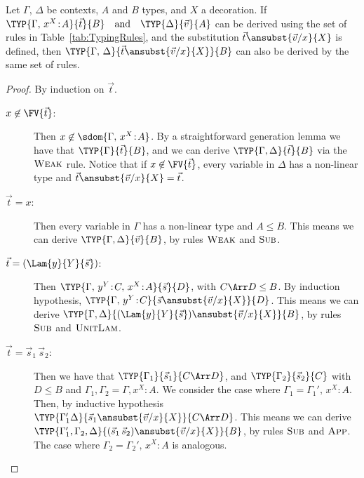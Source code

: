 \begin{lemma}[Substitution]\label{lem:Substitution}
  Let $\Gamma$, $\Delta$ be contexts, $A$ and $B$ types, and $X$ a decoration.
  If
  \(
    \TYP{\Gamma,\,x^{X}\!:\!A}{\vec{t}}{B}
    \quad\text{and}\quad
    \TYP{\Delta}{\vec{v}}{A}
  \) can be derived using the set of rules in Table~\ref{tab:TypingRules},
  and the substitution $\vec{t}\ansubst{\vec{v}/x}{X}$ is defined,
  then
  \(
    \TYP{\Gamma,\,\Delta}{\vec{t}\ansubst{\vec{v}/x}{X}}{B}
  \) can also be derived by the same set of rules.
\end{lemma}
\begin{proof}
  By induction on $\vec{t}$.
  \begin{description}
    \item[$x\not\in\FV{\vec{t}}$:] Then $x\not\in\sdom{\Gamma,\,x^{X}\!:\!A}$. By a straightforward generation lemma we have that $\TYP{\Gamma}{\vec{t}}{B}$, and we can derive $\TYP{\Gamma,\Delta}{\vec{t}}{B}$ via the $\textsc{Weak}$ rule. Notice that if $x\not\in\FV{\vec{t}}$, every variable in $\Delta$ has a non-linear type and $\vec{t}\ansubst{\vec{v}/x}{X}=\vec{t}$.
    
    \item[$\vec{t}=x$:] Then every variable in $\Gamma$ has a non-linear type and $A\leq B$. This means we can derive $\TYP{\Gamma,\Delta}{\vec{v}}{B}$, by rules $\textsc{Weak}$ and $\textsc{Sub}$.
    
    \item[$\vec{t}=(\Lam{y}{Y}{\vec{s}})$:] Then $\TYP{\Gamma,\,y^{Y}\!:\!C,\,x^{X}\!:\!A}{\vec{s}}{D}$, with $C\Arr D\leq B$. By induction hypothesis, $\TYP{\Gamma,\,y^{Y}\!:\!C}{\vec{s}\ansubst{\vec{v}/x}{X}}{D}$. This means we can derive $\TYP{\Gamma,\Delta}{(\Lam{y}{Y}{\vec{s}})\ansubst{\vec{v}/x}{X}}{B}$, by rules $\textsc{Sub}$ and $\textsc{UnitLam}$.
    
    \item[$\vec{t}=\vec{s}_{1}\,\vec{s}_{2}$:] Then we have that $\TYP{\Gamma_1}{\vec{s}_{1}}{C\Arr D}$, and $\TYP{\Gamma_2}{\vec{s}_{2}}{C}$ with $D\leq B$ and $\Gamma_1,\Gamma_2 = \Gamma,x^{X}\!:\!A$. We consider the case where $\Gamma_1 = \Gamma_1',\,x^{X}\!:\!A$. Then, by inductive hypothesis $\TYP{\Gamma_1'\Delta}{\vec{s}_{1}\ansubst{\vec{v}/x}{X}}{C\Arr D}$. This means we can derive $\TYP{\Gamma_1',\Gamma_2,\Delta}{(\vec{s}_{1}\,\vec{s}_{2})\ansubst{\vec{v}/x}{X}}{B}$, by rules $\textsc{Sub}$ and $\textsc{App}$. The case where $\Gamma_2 = \Gamma_2',\,x^{X}\!:\!A$ is analogous.
    

\end{description}
\end{proof}
